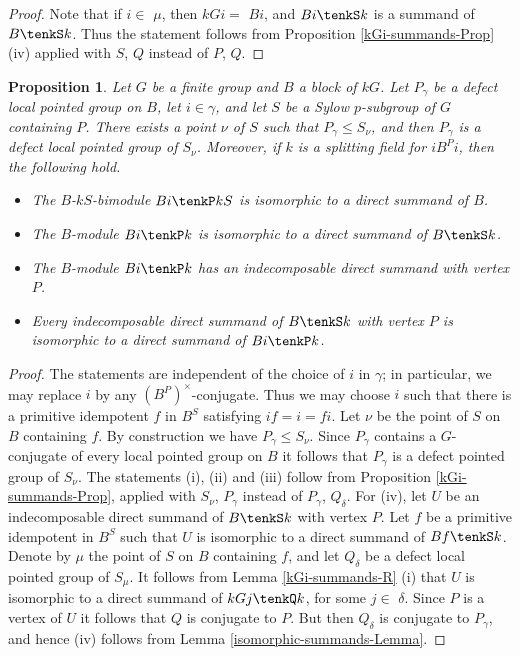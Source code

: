 \documentclass{amsart}
\theoremstyle{plain}\newtheorem{Theorem}{Theorem}[section]
\theoremstyle{plain}\newtheorem{Conjecture}[Theorem]{Conjecture}
\theoremstyle{plain}\newtheorem{Corollary}[Theorem]{Corollary}
\theoremstyle{plain}\newtheorem{Lemma}[Theorem]{Lemma}
\theoremstyle{plain}\newtheorem{Proposition}[Theorem]{Proposition}
\theoremstyle{definition}\newtheorem{Definition}[Theorem]{Definition}
\theoremstyle{definition}\newtheorem{Example}[Theorem]{Example}
\theoremstyle{definition}\newtheorem{Examples}[Theorem]{Examples}
\theoremstyle{definition}\newtheorem{Exercise}[Theorem]{Exercise}
\theoremstyle{definition}\newtheorem{Notation}[Theorem]{Notation}
\theoremstyle{definition}\newtheorem{Remark}[Theorem]{Remark}
\theoremstyle{definition}\newtheorem{Remarks}[Theorem]{Remarks}
\theoremstyle{plain}\newtheorem{Statement}[Theorem]{}
\begin{document}
\begin{proof}
Note that if $i\in$ $\mu$, then $kGi=$ $Bi$, and $Bi\tenkS k$ is a summand 
of $B\tenkS k$. Thus the statement follows from Proposition 
\ref{kGi-summands-Prop} (iv) applied with $S$, $Q$  instead of $P$, $Q$.
\end{proof}

\begin{Proposition} \label{BiBS-summand-Prop}
Let $G$ be a finite group and $B$ a block
of $kG$.  Let $P_\gamma$ be a defect local pointed group on $B$,
let $i\in\gamma$,  and let $S$ be a Sylow $p$-subgroup of $G$ containing $P$.
There exists a point $\nu$ of $S$  such that $P_\gamma\leq S_\nu$, and then
$P_\gamma$ is a defect local pointed group of $S_\nu$. Moreover, if
$k$ is a splitting field for $iB^Pi$, then  the following hold.
\begin{itemize}
\item[{\rm (i)}]
The $B$-$kS$-bimodule $Bi\tenkP kS$ is isomorphic to a direct summand of $B$. 
\item[{\rm (ii)}] 
The $B$-module $Bi\tenkP k$ is isomorphic to  a direct summand of $B\tenkS k$.
\item[{\rm (iii)}]
The $B$-module  $Bi\tenkP k$ has an indecomposable direct  summand with vertex $P$.
\item[{\rm (iv)}]
Every indecomposable direct summand of $B\tenkS k$ with vertex $P$ is isomorphic 
to a direct summand of $Bi\tenkP k$. 
\end{itemize}
\end{Proposition}

\begin{proof}
The statements are independent of the choice of $i$ in $\gamma$; in particular,
we may replace $i$ by any $(B^P)^\times$-conjugate. Thus we may choose $i$
such that there is a primitive idempotent $f$ in $B^S$ satisfying
$if=i=fi$. Let $\nu$ be the point of $S$ on $B$ containing $f$. By construction
we have $P_\gamma\leq S_\nu$. Since $P_\gamma$
contains a $G$-conjugate of every local pointed group on $B$ it follows that
$P_\gamma$ is a defect pointed group of $S_\nu$.
The statements (i), (ii) and (iii) follow from Proposition \ref{kGi-summands-Prop},
applied with $S_\nu$, $P_\gamma$ instead of $P_\gamma$, $Q_\delta$.
For (iv), let $U$ be an indecomposable direct summand of $B\tenkS k$ with
vertex $P$. Let $f$ be a primitive idempotent in $B^S$ such that $U$ is
isomorphic to a direct summand of $Bf\tenkS k$. Denote by $\mu$ the point
of $S$ on $B$ containing $f$, and let $Q_\delta$ be a defect local pointed 
group of $S_\mu$. It follows from Lemma \ref{kGi-summands-R} (i) that
$U$ is isomorphic to a direct  summand of $kGj\tenkQ k$, for some $j\in$ $\delta$.
Since $P$ is a vertex of $U$ it follows that $Q$ is conjugate to $P$. But then
$Q_\delta$ is conjugate to $P_\gamma$, and hence (iv) follows from
Lemma \ref{isomorphic-summands-Lemma}. 
\end{proof}
\end{document}
